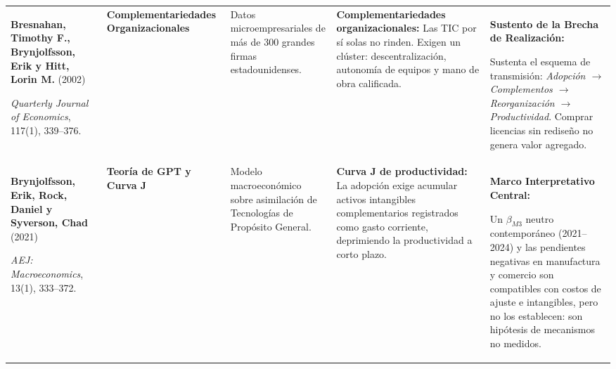 \documentclass[10pt,a4paper,landscape]{article}
\begin{document}
\begin{xltabular}{\textwidth}{@{} L{4.5cm} L{3.3cm} Y Y Y @{}}
  \textbf{Bresnahan, Timothy F., Brynjolfsson, Erik y Hitt, Lorin M.} (2002)\par
  \textit{Quarterly Journal of Economics}, 117(1), 339--376.\par
  [\texttt{bresnahan2002information}] &
  \textbf{Complementariedades Organizacionales} &
  Datos microempresariales de más de 300 grandes firmas estadounidenses. &
  \textbf{Complementariedades organizacionales:} Las TIC por sí solas no rinden. Exigen un clúster: descentralización, autonomía de equipos y mano de obra calificada. &
  \textbf{Sustento de la Brecha de Realización:}\par
  Sustenta el esquema de transmisión: \textit{Adopción $\rightarrow$ Complementos $\rightarrow$ Reorganización $\rightarrow$ Productividad}. Comprar licencias sin rediseño no genera valor agregado. \\
  \textbf{Brynjolfsson, Erik, Rock, Daniel y Syverson, Chad} (2021)\par
  \textit{AEJ: Macroeconomics}, 13(1), 333--372.\par
  [\texttt{brynjolfsson2021productivity}] &
  \textbf{Teoría de GPT y Curva J} &
  Modelo macroeconómico sobre asimilación de Tecnologías de Propósito General. &
  \textbf{Curva J de productividad:} La adopción exige acumular activos intangibles complementarios registrados como gasto corriente, deprimiendo la productividad a corto plazo. &
  \textbf{Marco Interpretativo Central:}\par
  Un $\beta_{M3}$ neutro contemporáneo (2021--2024) y las pendientes negativas en manufactura y comercio son compatibles con costos de ajuste e intangibles, pero no los establecen: son hipótesis de mecanismos no medidos. \\


\end{xltabular}
\end{document}
